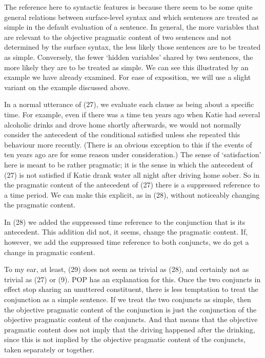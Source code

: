 \noindent The reference here to syntactic features is because there seem to be some quite general relations between surface-level syntax and which sentences are treated as simple in the default evaluation of a sentence. In general, the more variables that are  relevant to the objective pragmatic content of two sentences and not determined by the surface syntax, the less likely those sentences are to be treated as simple. Conversely, the fewer `hidden variables' shared by two sentences, the more likely they are to be treated as simple. We can see this illustrated by an example we have already examined. For ease of exposition, we will use a slight variant on the example discussed above.


\noindent In a normal utterance of (27), we evaluate each clause as being about a specific time. For example, even if there was a time ten years ago when Katie had several alcoholic drinks and drove home shortly afterwards, we would not normally consider the antecedent of the conditional satisfied unless she repeated this behaviour more recently. (There is an obvious exception to this if the events of ten years ago are for some reason under consideration.) The sense of `satisfaction' here is meant to be rather pragmatic; it is the sense in which the antecedent of (27) is not satisfied if Katie drank water all night after driving home sober. So in the pragmatic content of the antecedent of (27) there is a suppressed reference to a time period. We can make this explicit, as in (28), without noticeably changing the pragmatic content.


\noindent In (28) we added the suppressed time reference to the conjunction that is its antecedent. This addition did not, it seems, change the pragmatic content. If, however, we add the suppressed time reference to both conjuncts, we do get a change in pragmatic content.


\noindent To my ear, at least, (29) does not seem as trivial as (28), and certainly not as trivial as (27) or (9). POP has an explanation for this. Once the two conjuncts in effect stop sharing an unuttered constituent, there is less temptation to treat the conjunction as a simple sentence. If we treat the two conjuncts as simple, then the objective pragmatic content of the conjunction is just the conjunction of the objective pragmatic content of the conjuncts. And that means that the objective pragmatic content does not imply that the driving happened after the drinking, since this is not implied by the objective pragmatic content of the conjuncts, taken separately or together.

